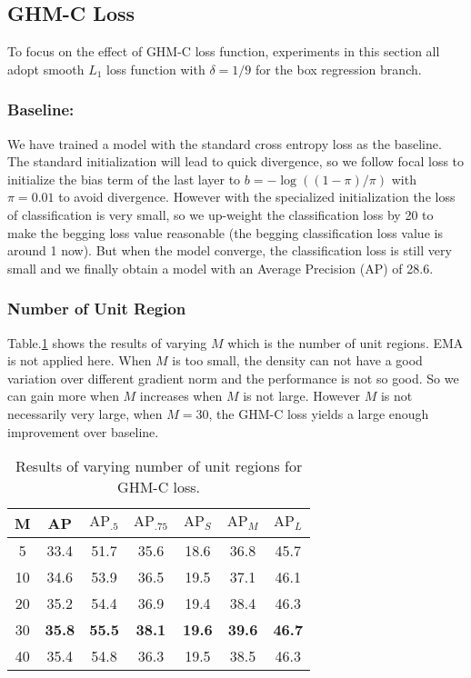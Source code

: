 \documentclass[letterpaper]{article} \usepackage{aaai19}  \usepackage{times}  \usepackage{helvet}  \usepackage{courier}  \usepackage{url}  \usepackage{graphicx}  \usepackage{amsmath,amssymb}
\begin{document}
\subsection{GHM-C Loss}
To focus on the effect of  GHM-C loss function, experiments in this section all adopt smooth $L_1$ loss function with $\delta=1/9$ for the box regression branch. 

\subsubsection{Baseline:} We have trained a model with the standard cross entropy loss as the baseline. The standard initialization will lead to quick divergence, so we follow focal loss \cite{focal} to initialize the bias term of the last layer to $b = -\log((1-\pi)/\pi)$ with $\pi=0.01$ to avoid divergence. However with the specialized initialization the loss of classification is very small, so we up-weight the classification loss by 20 to make the begging loss value reasonable (the begging classification loss value is around 1 now). But when the model converge, the classification loss is still very small and we finally obtain a model with an Average Precision (AP) of 28.6.

\subsubsection{Number of Unit Region}
Table.\ref{tab:num} shows the results of varying $M$ which is the number of unit regions. EMA is not applied here. When $M$ is too small, the density can not have a good variation over different gradient norm and the performance is not so good. So we can gain more when $M$ increases when $M$ is not large. However $M$ is not necessarily very large, when $M = 30$, the GHM-C loss yields a large enough improvement over  baseline.
\begin{table}[!ht]
\begin{center}
\begin{tabular}{| c | c  c  c  c  c  c |}
\hline
M & AP & $\text{AP}_{.5}$ & $\text{AP}_{.75}$ & $\text{AP}_{S}$ & $\text{AP}_{M}$ & $\text{AP}_{L}$ \\
\hline
5 & 33.4 & 51.7 & 35.6 & 18.6 & 36.8 & 45.7 \\
10 & 34.6 & 53.9 & 36.5 & 19.5 & 37.1 & 46.1 \\
20 & 35.2 & 54.4 & 36.9 & 19.4 & 38.4 & 46.3 \\
30 & \textbf{35.8} & \textbf{55.5} & \textbf{38.1} & \textbf{19.6} & \textbf{39.6} & \textbf{46.7} \\
40 & 35.4 & 54.8 & 36.3 & 19.5 & 38.5 & 46.3 \\
\hline 
\end{tabular}
\caption{Results of varying number of unit regions for GHM-C loss.}
\label{tab:num}
\end{center}
\end{table}
\end{document}
